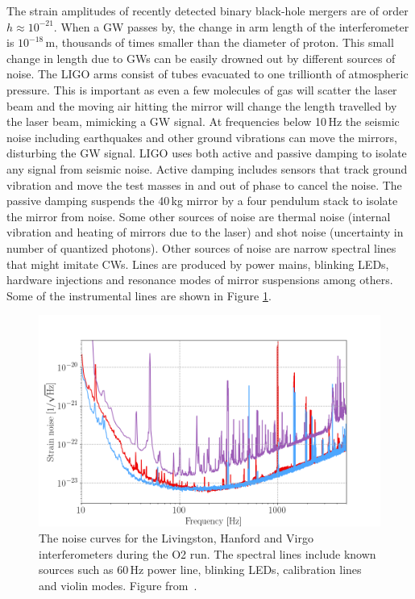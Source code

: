 \documentclass{ttuthes2007}
\begin{document}
The strain amplitudes of recently detected binary black-hole mergers are of
order $h \approx10^{-21}$. When a \ac{GW} passes by, the change in arm length of
the interferometer is $10^{-18}$\,m, thousands of times smaller than the
diameter of proton. This small change in length due to \acp{GW} can be easily
drowned out by different sources of noise. The LIGO arms consist of tubes
evacuated to one trillionth of atmospheric pressure. This is important as even a
few molecules of gas will scatter the laser beam and the moving air hitting the
mirror will change the length travelled by the laser beam, mimicking a \ac{GW}
signal.  At frequencies below 10\,Hz the seismic noise including earthquakes and
other ground vibrations can move the mirrors, disturbing the \ac{GW} signal.
LIGO uses both active and passive damping to isolate any signal from seismic
noise.  Active damping includes sensors that track ground vibration and move the
test masses in and out of phase to cancel the noise. The passive damping
suspends the 40\,kg mirror by a four pendulum stack to isolate the mirror from
noise. Some other sources of noise are thermal noise (internal vibration and
heating of mirrors due to the laser) and shot noise (uncertainty in number of
quantized photons).  Other sources of noise are narrow spectral lines that might
imitate \acp{CW}.  Lines are produced by power mains, blinking LEDs, hardware
injections and resonance modes of mirror suspensions among others. Some of the
instrumental lines are shown in Figure \ref{fig:CWnoise}.
\begin{figure}[bht!]
	\includegraphics[width=\textwidth]{figure/CWnoise.png}
	\caption{The noise curves for the Livingston, Hanford and Virgo
interferometers during the \ac{O2} run. The spectral lines include known sources
such as 60\,Hz power line, blinking LEDs, calibration lines and violin modes.
Figure from~\cite{Abbott_2019}.}
	\label{fig:CWnoise}
\end{figure}
\end{document}
